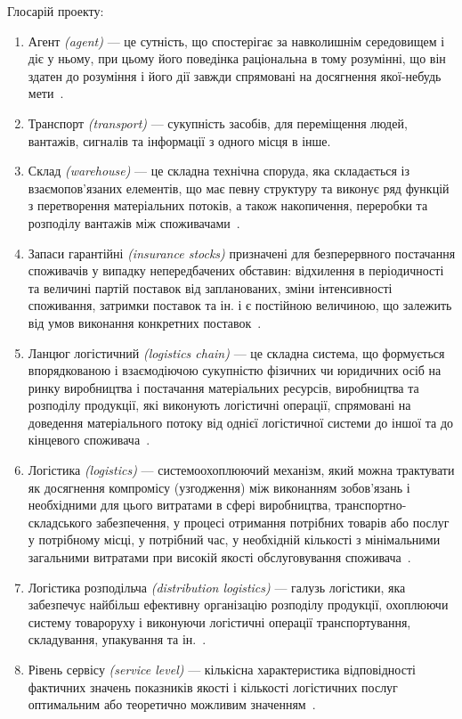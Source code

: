 Глосарій проекту:
\begin{enumerate}
	\item Агент \textit{(agent)} --- це сутність, що спостерігає за навколишнім середовищем і діє у ньому, при цьому його поведінка раціональна в тому розумінні, що він здатен до розуміння і його дії завжди спрямовані на досягнення якої-небудь мети~\cite{Jennings1998}.
	\item Транспорт \textit{(transport)} --- сукупність засобів, для переміщення людей, вантажів, сигналів та інформації з одного місця в інше.
	\item Склад \textit{(warehouse)} --- це складна технічна споруда, яка складається із взаємопов'язаних елементів, що має певну структуру та виконує ряд функцій з перетворення матеріальних потоків, а також накопичення, переробки та розподілу вантажів між споживачами~\cite{Kusluy2010}.
	\item Запаси гарантійні \textit{(insurance stocks)} призначені для безперервного постачання споживачів у випадку непередбачених обставин: відхилення в періодичності та величині партій поставок від запланованих, зміни інтенсивності споживання, затримки поставок та ін. і є постійною величиною, що залежить від умов виконання конкретних поставок~\cite{Kusluy2010}.
	\item Ланцюг логістичний \textit{(logistics chain)}  --- це складна система, що формується впорядкованою і взаємодіючою сукупністю фізичних чи юридичних осіб на ринку виробництва і постачання матеріальних ресурсів, виробництва та розподілу продукції, які виконують логістичні операції, спрямовані на доведення матеріального потоку від однієї логістичної системи до іншої та до кінцевого споживача~\cite{Kusluy2010}.
	\item Логістика \textit{(logistics)} --- системоохоплюючий механізм, який можна трактувати як досягнення компромісу (узгодження) між виконанням зобов’язань і необхідними для цього витратами в сфері виробництва, транспортно-складського забезпечення, у процесі отримання потрібних товарів або послуг у потрібному місці, у потрібний час, у необхідній кількості з мінімальними загальними витратами при високій якості обслуговування споживача~\cite{Kusluy2010}.
	\item Логістика розподільча \textit{(distribution logistics)} --- галузь логістики, яка забезпечує найбільш ефективну організацію розподілу продукції, охоплюючи систему товароруху і виконуючи логістичні операції транспортування, складування, упакування та ін.~\cite{Kusluy2010}.
	\item Рівень сервісу \textit{(service level)} --- кількісна характеристика відповідності фактичних значень показників якості і кількості логістичних послуг оптимальним або теоретично можливим значенням~\cite{Kusluy2010}.

\end{enumerate}
